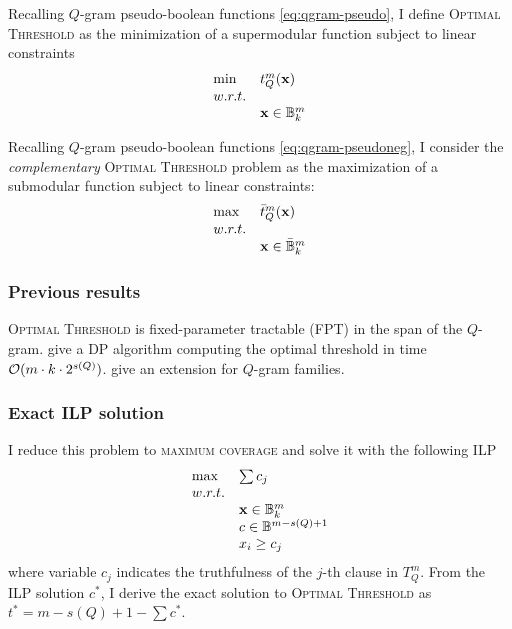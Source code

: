 Recalling $Q$-gram pseudo-boolean functions \ref{eq:qgram-pseudo}, I define \textsc{Optimal Threshold} as the minimization of a supermodular function subject to linear constraints
\begin{equation}
\begin{array}{ll}
\text{min} & t_{Q}^{m} (\mathbf{x})			\\
w.r.t.								\\
& \mathbf{x} \in \mathbb {B}^m_k				\\
\end{array}
\end{equation}

Recalling $Q$-gram pseudo-boolean functions \ref{eq:qgram-pseudoneg}, I consider the \emph{complementary} \textsc{Optimal Threshold} problem as the maximization of a submodular function subject to linear constraints:
\begin{equation}
\begin{array}{ll}
\text{max} & \bar{t}_{Q}^{m} (\mathbf{x})		\\
w.r.t.								\\
& \mathbf{x} \in \bar{\mathbb {B}}^m_k			\\
\end{array}
\end{equation}

\subsubsection{Previous results}

\textsc{Optimal Threshold} is fixed-parameter tractable (FPT) in the span of the $Q$-gram.
 \cite{Burkhardt2001} give a DP algorithm computing the optimal threshold in time $\mathcal{O}(m \cdot k \cdot 2^{s(Q)})$.
\cite{Kucherov2005} give an extension for $Q$-gram families.

\subsubsection{Exact ILP solution}

I reduce this problem to \textsc{maximum coverage} \citep{Vazirani2001} and solve it with the following ILP
\begin{equation}
\begin{array}{ll}
\text{max} & \sum c_j					\\
w.r.t.							\\
& \mathbf{x} \in \mathbb {B}^m_k			\\
& c \in \mathbb {B}^{m - s(Q) + 1}		\\
& x_i \geq c_j				\\
\end{array}
\end{equation}
where variable $c_j$ indicates the truthfulness of the $j$-th clause in $T_{Q}^{m}$.
From the ILP solution $c^*$, I derive the exact solution to \textsc{Optimal Threshold} as $t^* = m - s(Q) + 1 - \sum c^*$.


